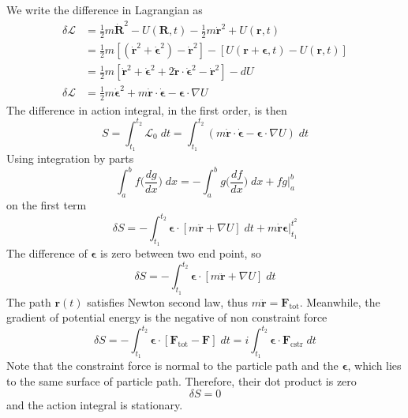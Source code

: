 \documentclass[../../../main.tex]{subfiles}
\begin{document}
We write the difference in Lagrangian as
\begin{align*}
	\delta \mathcal{L} & =\frac{1}{2}m\dot{\mathbf{R}}^2-U(\mathbf{R},t)-\frac{1}{2}m\dot{\mathbf{r}}^2+U(\mathbf{r},t)                                                                     \\
	                   & =\frac{1}{2}m\left[(\dot{\mathbf{r}}^2+\dot{\boldsymbol{\epsilon}}^2)-\dot{\mathbf{r}}^2\right]-\left[U(\mathbf{r}+\boldsymbol{\epsilon},t)-U(\mathbf{r},t)\right] \\
	                   & =\frac{1}{2}m\left[\dot{\mathbf{r}}^2+\dot{\boldsymbol{\epsilon}}^2+2\dot{\mathbf{r}}\cdot\dot{\boldsymbol{\epsilon}}^2-\dot{\mathbf{r}}^2\right]-dU               \\
	\delta\mathcal{L}  & =\frac{1}{2}m\dot{\boldsymbol{\epsilon}}^2+m\dot{\mathbf{r}}\cdot\dot{\boldsymbol{\epsilon}}-{\boldsymbol{\epsilon}}\cdot \nabla U
\end{align*}
The difference in action integral, in the first order, is then
\begin{equation*}
	S=\int_{t_1}^{t_2}\mathcal{L}_0\;dt=\int_{t_1}^{t_2}\left(m\dot{\mathbf{r}}\cdot\dot{\boldsymbol{\epsilon}}-\boldsymbol{\epsilon}\cdot\nabla U\right)\;dt
\end{equation*}
Using integration by parts
\begin{equation*}
	\int_{a}^{b} f\bigg(\frac{dg}{dx}\bigg)\;dx=-\int_{a}^{b} g\bigg(\frac{df}{dx}\bigg)\;dx+ fg \bigg\lvert_{a}^{b}
\end{equation*}
on the first term
\begin{equation*}
	\delta S=-\int_{t_1}^{t_2}\boldsymbol{\epsilon}\cdot\left[m\ddot{\mathbf{r}}+\nabla U\right]\;dt+m\dot{\mathbf{r}}\boldsymbol{\epsilon}\bigg|_{t_1}^{t^2}
\end{equation*}
The difference of $\boldsymbol{\epsilon}$ is zero between two end point, so
\begin{equation*}
	\delta S=-\int_{t_1}^{t_2}\boldsymbol{\epsilon}\cdot\left[m\ddot{\mathbf{r}}+\nabla U\right]\;dt
\end{equation*}
The path $\mathbf{r}(t)$ satisﬁes Newton second law, thus $m\ddot{\mathbf{r}}=\mathbf{F}_\text{tot}$.
Meanwhile, the gradient of potential energy is the negative of non constraint force
\begin{equation*}
	\delta S=-\int_{t_1}^{t_2}\boldsymbol{\epsilon}\cdot\left[\mathbf{F}_\text{tot}-\mathbf{F}\right]\;dt=i\int_{t_1 }^{t_2}\boldsymbol{\epsilon}\cdot \mathbf{F}_\text{cstr}\;dt
\end{equation*}
Note that the constraint force is normal to the particle path and the $\boldsymbol{\epsilon}$, which lies to the same surface of particle path.
Therefore, their dot product is zero
\begin{equation*}
	\delta S=0
\end{equation*}
and the action integral is stationary.
\end{document}
